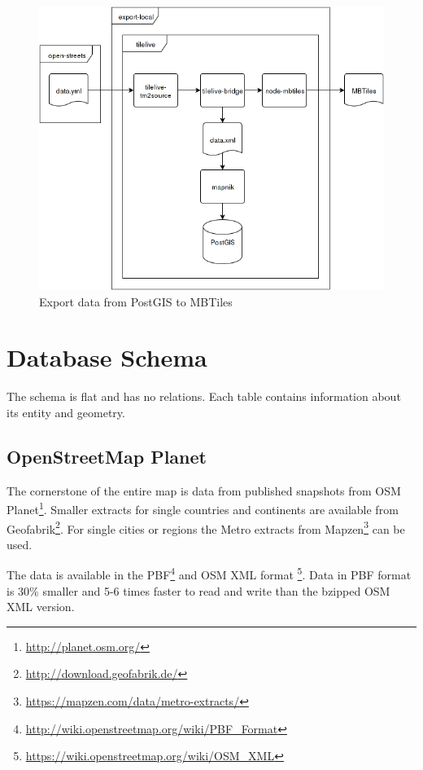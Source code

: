 \begin{figure}[h]
  \includegraphics[scale=0.6]{images/export_package_flow.png}
  \caption{Export data from PostGIS to MBTiles}
\end{figure}

\newpage
\section{Database Schema}\label{database-schema}
The schema is flat and has no relations. Each table contains information about its entity and geometry. 

\subsection{OpenStreetMap Planet}

The cornerstone of the entire map is \osm{} data from published snapshots from OSM Planet\footnote{\url{http://planet.osm.org/}}.
Smaller extracts for single countries and continents are available from Geofabrik\footnote{\url{http://download.geofabrik.de/}}.
For  single cities or regions the Metro extracts from Mapzen\footnote{\url{https://mapzen.com/data/metro-extracts/}} can be used.

The data is available in the PBF\footnote{\url{http://wiki.openstreetmap.org/wiki/PBF_Format}} and OSM XML format \footnote{\url{https://wiki.openstreetmap.org/wiki/OSM_XML}}. 
Data in PBF format is 30\% smaller and 5-6 times faster to read and write than the bzipped OSM XML version.


